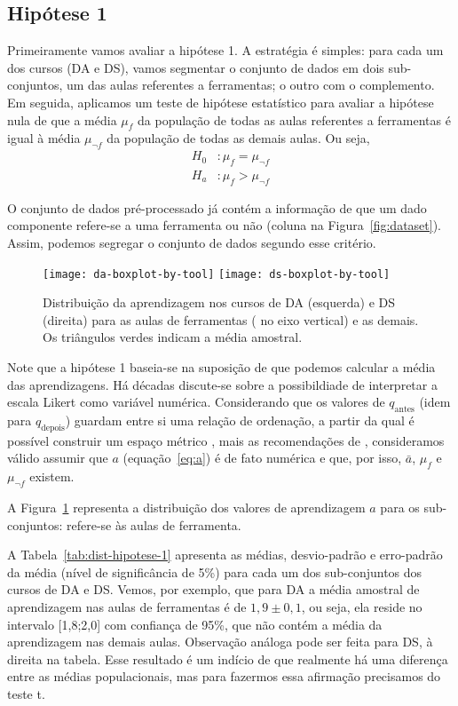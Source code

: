 \subsection{Hipótese 1}

Primeiramente vamos avaliar a hipótese 1.
A estratégia é simples: para cada um dos cursos (DA e DS), vamos segmentar o conjunto de dados em dois sub-conjuntos, um das aulas referentes a ferramentas; o outro com o complemento.
Em seguida, aplicamos um teste de hipótese estatístico para avaliar a hipótese nula de que a média $\mu_f$ da população de todas as aulas referentes a ferramentas é igual à média $\mu_{\neg f}$ da população de todas as demais aulas.
Ou seja,
\begin{align*}
	H_0&: \mu_f = \mu_{\neg f} \\
	H_a&: \mu_f > \mu_{\neg f}
\end{align*}

O conjunto de dados pré-processado já contém a informação de que um dado componente refere-se a uma ferramenta ou não (coluna  na Figura~\ref{fig:dataset}).
Assim, podemos segregar o conjunto de dados segundo esse critério.

\begin{figure}[b]
	\centering
	\texttt{[image: da-boxplot-by-tool]}\hfill
	\texttt{[image: ds-boxplot-by-tool]}
	\caption{Distribuição da aprendizagem nos cursos de DA (esquerda) e DS (direita) para as aulas de ferramentas ( no eixo vertical) e as demais. Os triângulos verdes indicam a média amostral.}
	\label{fig:dist-hipotese-1}
\end{figure}

Note que a hipótese 1 baseia-se na suposição de que podemos calcular a média das aprendizagens.
Há décadas discute-se sobre a possibildiade de interpretar a escala Likert como variável numérica.
Considerando que os valores de $q_\text{antes}$ (idem para $q_\text{depois}$) guardam entre si uma relação de ordenação, a partir da qual é possível construir um espaço métrico \cite[cap.~27]{Barata2020}, mais as recomendações de \cite{Harpe2015}, consideramos válido assumir que $a$ (equação~\ref{eq:a}) é de fato numérica e que, por isso, $\bar a$, $\mu_f$ e $\mu_{\neg f}$ existem.

A Figura~\ref{fig:dist-hipotese-1} representa a distribuição dos valores de aprendizagem $a$ para os sub-conjuntos:  refere-se às aulas de ferramenta.

A Tabela~\ref{tab:dist-hipotese-1} apresenta as médias, desvio-padrão e erro-padrão da média (nível de significância de 5\%) para cada um dos sub-conjuntos dos cursos de DA e DS.
Vemos, por exemplo, que para DA a média amostral de aprendizagem nas aulas de ferramentas é de $1,9\pm{0,1}$, ou seja, ela reside no intervalo [1,8;2,0] com confiança de 95\%, que não contém a média da aprendizagem nas demais aulas.
Observação análoga pode ser feita para DS, à direita na tabela.
Esse resultado é um indício de que realmente há uma diferença entre as médias populacionais, mas para fazermos essa afirmação precisamos do teste t.

